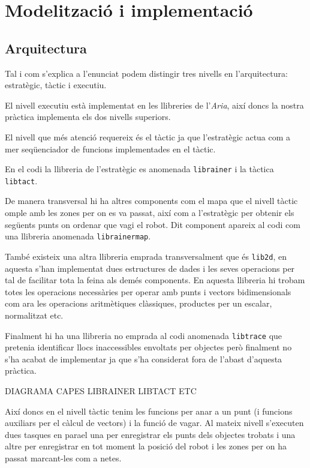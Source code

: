 \section{Modelització i implementació}

\subsection{Arquitectura}
Tal i com s'explica a l'enunciat podem distingir tres nivells en l'arquitectura: estratègic, tàctic i executiu.

El nivell executiu està implementat en les llibreries de l'\emph{Aria}, així doncs la nostra pràctica implementa
els dos nivells superiors.

El nivell que més atenció requereix és el tàctic ja que l'estratègic actua com a mer seqüenciador
de funcions implementades en el tàctic.

En el codi la llibreria de l'estratègic es anomenada \texttt{librainer} i la tàctica \texttt{libtact}.

De manera transversal hi ha altres components com el mapa que el nivell tàctic omple amb les zones
per on es va passat, així com a l'estratègic per obtenir els següents punts on ordenar que vagi el robot.
Dit component apareix al codi com una llibreria anomenada \texttt{librainermap}.

També existeix una altra llibreria emprada transversalment que és \texttt{lib2d}, en aquesta s'han implementat
dues estructures de dades i les seves operacions per tal de facilitar tota la feina als demés components.
En aquesta llibreria hi trobam totes les operacions necessàries per operar amb punts i vectors bidimensionals
com ara les operacions aritmètiques clàssiques, productes per un escalar, normalitzat etc.

Finalment hi ha una llibreria no emprada al codi anomenada \texttt{libtrace} que pretenia identificar llocs
inaccessibles envoltats per objectes però finalment no s'ha acabat de implementar ja que s'ha considerat
fora de l'abast d'aquesta pràctica.


DIAGRAMA CAPES LIBRAINER LIBTACT ETC

Així doncs en el nivell tàctic tenim les funcions per anar a un punt (i funcions auxiliars per el càlcul
de vectors) i la funció de vagar. Al mateix nivell s'executen dues tasques en para\lgem el una per
enregistrar els punts dels objectes trobats i una altre per enregistrar en tot moment la posició del 
robot i les zones per on ha passat marcant-les com a netes.

